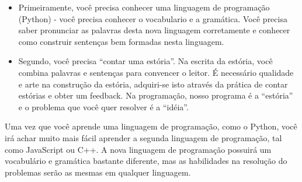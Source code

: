 \begin{itemize}
%

\item Primeiramente, você precisa conhecer uma linguagem de programação (Python) -
você precisa conhecer o vocabulario e a gramática. Você precisa saber
pronunciar as palavras desta nova linguagem corretamente e conhecer como construir
sentenças bem formadas nesta linguagem.
%

\item Segundo, você precisa ``contar uma estória''. Na escrita da estória,
você combina palavras e sentenças para convencer o leitor.
É necessário qualidade e arte na construção da estória, adquiri-se
isto através da prática de contar estórias e obter um feedback.
Na programação, nosso programa é a ``estória'' e o problema que você
quer resolver é a ``idéia''.
%

\end{itemize}
%

Uma vez que você aprende uma linguagem de programação, como o Python, você irá
achar muito mais fácil aprender a segunda linguagem de programação, tal como
JavaScript ou C++. A nova linguagem de programação possuirá um vocabulário
e gramática bastante diferente, mas as habilidades na resolução do problemas
serão as mesmas em qualquer linguagem.
%


